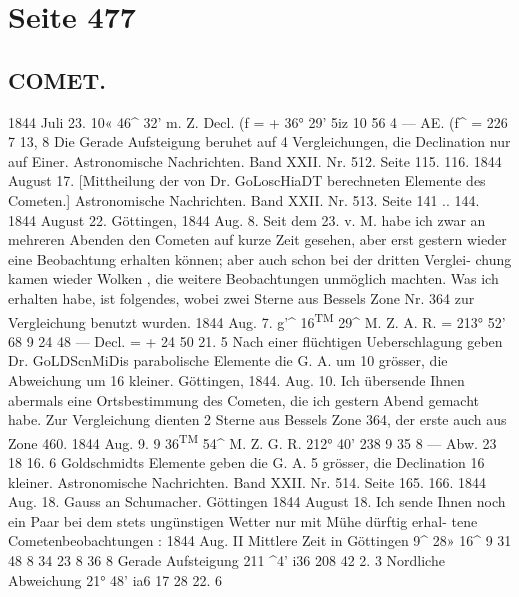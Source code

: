 \documentclass[10pt,a4paper]{article}
\begin{document}
\newpage
\section*{Seite 477}

\subsection*{COMET.}

1844  Juli  23.     10«  46\glqq{}\textasciicircum{}  32'  m.  Z.    Decl.  (f  =  +  36°  29'    5i\glqq{}z
10     56      4      ---         AE.    (f\textasciicircum{}  =      226       7     13, 8
Die  Gerade  Aufsteigung  beruhet  auf  4  Vergleichungen,  die  Declination  nur  auf  Einer.
Astronomische  Nachrichten.     Band  XXII.  Nr.  512.  Seite  115.  116.     1844  August  17.
[Mittheilung  der  von  Dr.  GoLoscHiaDT  berechneten  Elemente  des  Cometen.]
Astronomische  Nachrichten.    Band  XXII.  Nr.  513.  Seite  141 ..  144.     1844  August  22.
Göttingen,  1844  Aug.  8.
Seit  dem  23.  v.  M.  habe    ich  zwar  an  mehreren  Abenden  den   Cometen  auf   kurze  Zeit  gesehen,
aber  erst  gestern  wieder  eine  Beobachtung  erhalten  können;    aber   auch  schon   bei  der  dritten  Verglei-
chung  kamen  wieder   Wolken ,  die  weitere  Beobachtungen  unmöglich  machten.     Was  ich  erhalten  habe,
ist  folgendes,  wobei  zwei  Sterne  aus  Bessels  Zone  Nr.  364  zur  \glqq{}Vergleichung  benutzt  wurden.
1844  Aug.  7.     g'\textasciicircum{}  16\textsuperscript{TM}  29\textasciicircum{}  M.  Z.         A.  R.  =      213°  52'      6\glqq{}8
9    24    48     ---  Decl.   =  +  24    50    21. 5
Nach  einer  flüchtigen  Ueberschlagung   geben  Dr.  GoLDScnMiDis   parabolische   Elemente  die  G.  A.
um  10\glqq{}  grösser,  die  Abweichung  um  16\glqq{}  kleiner.
Göttingen,  1844.  Aug.  10.
Ich  übersende  Ihnen  abermals  eine  Ortsbestimmung  des  Cometen,  die  ich  gestern  Abend  gemacht
habe.     Zur  Vergleichung  dienten  2  Sterne  aus  Bessels  Zone  364,  der  erste  auch  aus  Zone  460.
1844  Aug.  9.     9\glqq{}  36\textsuperscript{TM}  54\textasciicircum{}  M.  Z.        G.  R.  212°  40'   23\glqq{}8
9     35       8      ---  Abw.     23     18     16. 6
Goldschmidts  Elemente  geben  die  G.  A.  5\glqq{}  grösser,  die  Declination  16\glqq{}  kleiner.
Astronomische  Nachrichten.     Band  XXII.  Nr.  514.  Seite  165.  166.     1844  Aug.  18.
Gauss  an  Schumacher.     Göttingen  1844  August  18.
Ich  sende  Ihnen  noch   ein  Paar  bei  dem   stets  ungünstigen  Wetter  nur  mit  Mühe  dürftig  erhal-
tene Cometenbeobachtungen :
1844
Aug.  II
Mittlere  Zeit
in  Göttingen
9\textasciicircum{}  28»\glqq{}  16\textasciicircum{}
9  31     48
8  34     23
8  36       8
Gerade
Aufsteigung
211\glqq{}  \textasciicircum{}4'    i3\glqq{}6
208     42       2. 3
Nordliche
Abweichung
21°  48'    ia\glqq{}6
17     28     22. 6
\end{document}
